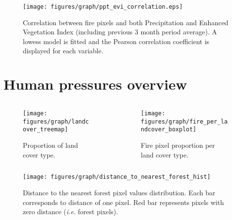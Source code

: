 \documentclass[10pt]{beamer}
\begin{document}
\begin{frame}{}
    \begin{figure}
        \centering
        \texttt{[image: figures/graph/ppt\_evi\_correlation.eps]}
        \caption{Correlation between fire pixels and both Precipitation and Enhanced Vegetation Index (including previous 3 month period average). A lowess model is fitted and the Pearson correlation coefficient is displayed for each variable.}
    \end{figure}
\end{frame}

\section{Human pressures overview}

\begin{frame}{}
    \begin{columns}[onlytextwidth]
        \begin{column}{0.5\textwidth}
            \begin{figure}
                \centering
                 \texttt{[image: figures/graph/landcover\_treemap]}
                \caption{Proportion of land cover type.}
            \end{figure}
        \end{column}
        \begin{column}{0.5\textwidth}
            \begin{figure}
                \centering
                 \texttt{[image: figures/graph/fire\_per\_landcover\_boxplot]}
                \caption{Fire pixel proportion per land cover type.}
            \end{figure}
        \end{column}
    \end{columns}
\end{frame}

\begin{frame}{}
    \begin{figure}
        \centering
        \texttt{[image: figures/graph/distance\_to\_nearest\_forest\_hist]}
        \caption{Distance to the nearest forest pixel values distribution. Each bar corresponds to distance of one pixel. Red bar represents pixels with zero distance (\emph{i.e.} forest pixels).}
    \end{figure}
\end{frame}
\end{document}

